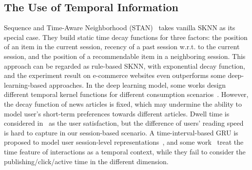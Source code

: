 \subsection{The Use of Temporal Information}
Sequence and Time-Aware Neighborhood (STAN)~\cite{garg2019sequence} takes vanilla SKNN as its special case. They build static time decay functions for three factors: the position of an item in the current session, recency of a past session w.r.t. to the current session, and the position of a recommendable item in a neighboring session. This approach can be regarded as rule-based SKNN, with exponential decay function, and the experiment result on e-commerce websites even outperforms some deep-learning-based approaches. 
In the deep learning model, some works design different temporal kernel functions for different consumption scenarios~\cite{wang2020make,wu2020deja}. However, the decay function of news articles is fixed, which may undermine the ability to model user's short-term preferences towards different articles. Dwell time is considered in~\cite{wu2020CPRS} as the user satisfaction, but the difference of users' reading speed is hard to capture in our session-based scenario. A time-interval-based GRU is proposed to model user session-level representations~\cite{lei_tissa_2019}, and some work~\cite{rakkappan2019context,xu2019time,wu_recommender_2019} treat the time feature of interactions as a temporal context, while they fail to consider the publishing/click/active time in the different dimension.
